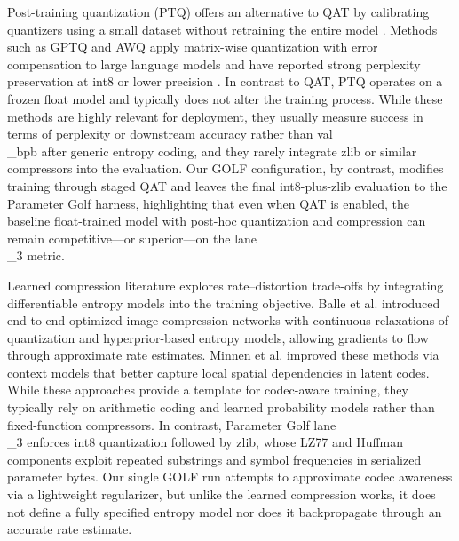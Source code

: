 \documentclass{article}
\begin{document}
Post-training quantization (PTQ) offers an alternative to QAT by calibrating quantizers using a small dataset without retraining the entire model \cite{banner2019post, frantar2022gptq}. Methods such as GPTQ and AWQ apply matrix-wise quantization with error compensation to large language models and have reported strong perplexity preservation at int8 or lower precision \cite{frantar2022gptq, dettmers2022llm, lin2023awq}. In contrast to QAT, PTQ operates on a frozen float model and typically does not alter the training process. While these methods are highly relevant for deployment, they usually measure success in terms of perplexity or downstream accuracy rather than val\\_bpb after generic entropy coding, and they rarely integrate zlib or similar compressors into the evaluation. Our GOLF configuration, by contrast, modifies training through staged QAT and leaves the final int8-plus-zlib evaluation to the Parameter Golf harness, highlighting that even when QAT is enabled, the baseline float-trained model with post-hoc quantization and compression can remain competitive---or superior---on the lane\\_3 metric.

Learned compression literature explores rate--distortion trade-offs by integrating differentiable entropy models into the training objective. Balle et al. introduced end-to-end optimized image compression networks with continuous relaxations of quantization and hyperprior-based entropy models, allowing gradients to flow through approximate rate estimates. Minnen et al. improved these methods via context models that better capture local spatial dependencies in latent codes. While these approaches provide a template for codec-aware training, they typically rely on arithmetic coding and learned probability models rather than fixed-function compressors. In contrast, Parameter Golf lane\\_3 enforces int8 quantization followed by zlib, whose LZ77 and Huffman components exploit repeated substrings and symbol frequencies in serialized parameter bytes. Our single GOLF run attempts to approximate codec awareness via a lightweight regularizer, but unlike the learned compression works, it does not define a fully specified entropy model nor does it backpropagate through an accurate rate estimate.
\end{document}
